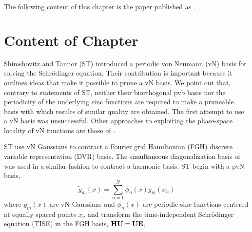 The following content of this chapter is the paper published as .


\section{Content of Chapter}


 Shimshovitz and Tannor (ST) \cite{Shimshovitz2012} introduced a periodic von Neumann (vN) basis for solving the Schr\"{o}dinger 
equation. 
%
 Their contribution is important because it outlines ideas that make it possible to prune a vN basis.
  We   point  out that, contrary to statements of ST,  neither their  biorthogonal  pvb basis nor the periodicity of the underlying sinc functions are required
to make  a pruneable basis with which results of similar quality are obtained.  
  The first attempt to use a vN basis \cite{Davis1979} was unsuccessful.  Other approaches to 
exploiting the phase-space locality of 
vN functions  are those of .

 ST use  vN Gaussians  to contract a 
Fourier grid Hamiltonian (FGH) discrete variable representation (DVR) basis.
  The simultaneous diagonalization basis of  was used in a similar fashion to contract a harmonic basis. 
 ST begin with a pvN basis, 
%
\begin{equation}\label{PRLeq.1}
\tilde{g}_m\left(x\right) =\sum_{n=1}^{N}\phi_n\left(x\right)g_m\left(x_n\right)
\end{equation}
where  $g_m(x)  $ are  vN Gaussians   and   $\phi_n\left(x\right)$ are  periodic sinc functions centered at 
equally spaced points  $x_n$ and transform  the time-independent Schr\"{o}dinger equation (TISE) in the FGH  basis,
 $\bf{ H   U} = {\bf{UE}}$, 
 
